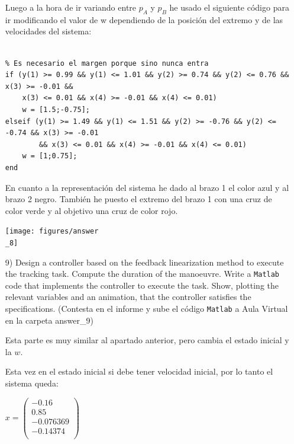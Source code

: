 \documentclass[a4paper]{article}
\begin{document}
\begin{itemize}
Luego a la hora de ir variando entre $p_{A}$ y $p_{B}$ he usado el siguiente código para ir modificando el valor de w dependiendo de la posición del extremo y de las velocidades del sistema:

\begin{tcolorbox}[width=12cm, title={Modificar w}]
\begin{scriptsize}
\begin{verbatim}

% Es necesario el margen porque sino nunca entra
if (y(1) >= 0.99 && y(1) <= 1.01 && y(2) >= 0.74 && y(2) <= 0.76 && x(3) >= -0.01 &&
    x(3) <= 0.01 && x(4) >= -0.01 && x(4) <= 0.01)
    w = [1.5;-0.75];
elseif (y(1) >= 1.49 && y(1) <= 1.51 && y(2) >= -0.76 && y(2) <= -0.74 && x(3) >= -0.01
        && x(3) <= 0.01 && x(4) >= -0.01 && x(4) <= 0.01)
    w = [1;0.75];
end

\end{verbatim}
\end{scriptsize}
\end{tcolorbox}

En cuanto a la representación del sistema he dado al brazo 1 el color azul y al brazo 2 negro. También he puesto el extremo del brazo 1 con una cruz de color verde y al objetivo una cruz de color rojo.

\begin{center}
	\texttt{[image: figures/answer\\\_8]}
\end{center}

\bigskip


\item[9)]  {\color{gray} Design a controller based on the feedback linearization method to execute the tracking task. Compute the duration of the manoeuvre. Write a \texttt{Matlab} code that implements the controller to execute the task. Show, plotting the relevant variables and an animation, that the controller satisfies the specifications.  (Contesta en el informe y sube el c\'odigo \texttt{Matlab} a Aula Virtual en la carpeta answer\_9)}

\bigskip

Esta parte es muy similar al apartado anterior, pero cambia el estado inicial y la $w$.

Esta vez en el estado inicial si debe tener velocidad inicial, por lo tanto el sistema queda:

\begin{center}
	$x = \begin{pmatrix}
		-0.16\\       
		0.85\\
		-0.076369\\
		-0.14374\\       
	\end{pmatrix}$
\end{center}


\end{itemize}
\end{document}
